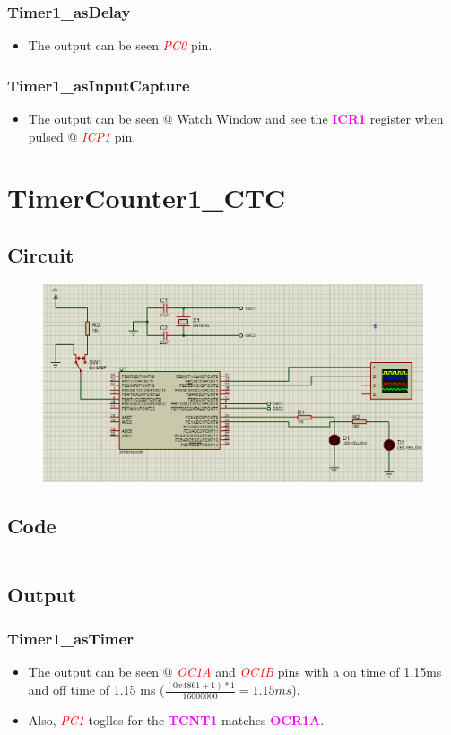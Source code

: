 \documentclass[oneside]{book}
\newcommand{\pinFormat}[1]{\emph{\textcolor{red}{#1}}}
\newcommand{\regFormat}[1]{\textbf{\textcolor{magenta}{#1}}}
\begin{document}
\subsubsection{Timer1\_asDelay}
\begin{itemize}
    \item The output can be seen \pinFormat{PC0} pin.
\end{itemize}
\subsubsection{Timer1\_asInputCapture}
\begin{itemize}
    \item The output can be seen @ Watch Window and see the \regFormat{ICR1} register when pulsed @ \pinFormat{ICP1} pin.
\end{itemize}

\section{TimerCounter1\_CTC}
\subsection{Circuit}
\begin{figure}[H]
    \centering
    \includegraphics[height=0.2\textheight]{TimerCounter1_CTC.png}
\end{figure}
\subsection{Code}
\inputminted[breaklines, bgcolor=black]{c}{../programFiles/TimerCounter1_CTC.c}
\subsection{Output}
\subsubsection{Timer1\_asTimer}
\begin{itemize}
    \item The output can be seen @ \pinFormat{OC1A} and \pinFormat{OC1B} pins with a on time of 1.15ms and off time of 1.15 ms ($\frac{(0x4861+1) * 1}{16000000} = 1.15 ms$).
    \item Also, \pinFormat{PC1} toglles for the \regFormat{TCNT1} matches \regFormat{OCR1A}.
\end{itemize}
\end{document}
